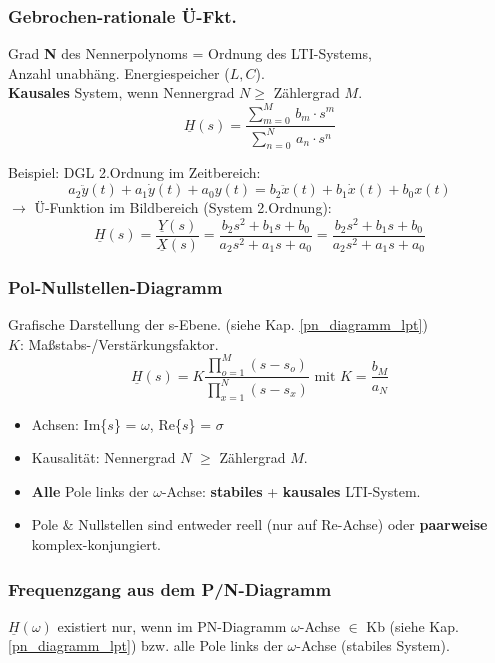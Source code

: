 \subsubsection{Gebrochen-rationale Ü-Fkt.}
{\small Grad \textbf{N} des Nennerpolynoms = Ordnung des LTI-Systems, \\ Anzahl unabhäng. Energiespeicher ($L, C$).\\
\textbf{Kausales} System, wenn Nennergrad $N\ge$ Z\"ahlergrad $M$}.
\[
\underline{H}(s)=\frac{\sum_{m=0}^{M} \, b_{m} \cdot s^{m}}{\sum_{n=0}^{N} \, a_{n} \cdot s^{n}}
\]

Beispiel: DGL 2.Ordnung im Zeitbereich:
\[
a_2\ddot{y}(t)+a_1\dot{y}(t)+a_0 y(t)=b_2\ddot{x}(t)+b_1\dot{x}(t)+b_0 x(t)
\]
$\rightarrow$ Ü-Funktion im Bildbereich (System 2.Ordnung):
\[
\underline{H}(s)=\frac{\underline{Y}(s)}{\underline{X}(s)}=\frac{b_2 s^2+b_1 s+b_0}{a_2 s^2 +a_1 s +a_0}
=\frac{b_2 s^2+b_1 s+b_0}{a_2 s^2 +a_1 s +a_0}
\]
\subsubsection{Pol-Nullstellen-Diagramm}\label{pn_diagramm_systeme}
{\small Grafische Darstellung der s-Ebene. (siehe Kap. \ref{pn_diagramm_lpt})\\
$K$: Maßstabs-/Verstärkungsfaktor.}
	\[
	 \underline{H}(s) = K \frac{\prod_{o=1}^{M} (s-s_o)}{\prod_{x=1}^{N} (s-s_x)} \text{ mit } K=\frac{b_M}{a_N}
	\]
\begin{itemize}
\item Achsen: Im\{$s$\} = $\omega$, \quad Re\{$s$\} = $\sigma$
\item Kausalität: Nennergrad $N$ $\ge$ Zählergrad $M$.
\item \textbf{Alle} Pole links der $\omega$-Achse: \textbf{stabiles} + \textbf{kausales} LTI-System.
\item Pole \& Nullstellen sind entweder reell (nur auf Re-Achse) oder \textbf{paarweise} komplex-konjungiert.
\end{itemize}
\subsubsection{Frequenzgang aus dem P/N-Diagramm}\label{fgang_pn}
      \small{$\underline{H}(\omega)$ existiert nur, wenn im PN-Diagramm $\omega$-Achse $\in$ Kb (siehe Kap. \ref{pn_diagramm_lpt}) bzw. alle Pole links der $\omega$-Achse (stabiles System).} \\
      
